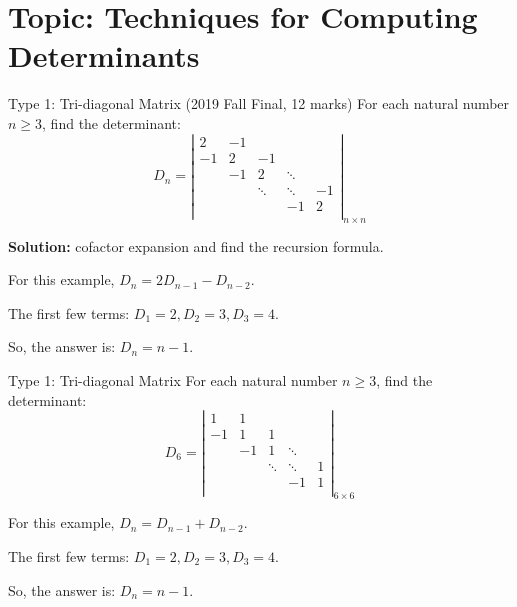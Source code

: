 \documentclass{beamer}
\begin{document}
\section{Topic: Techniques for Computing Determinants}
\begin{frame}{Type 1: Tri-diagonal Matrix}
(2019 Fall Final, 12 marks) For each natural number $n\geqslant 3$, find the determinant:
\begin{equation*}
    D_n=\left| \begin{matrix}
        2&		-1&		&		&		\\
        -1&		2&		-1&		&		\\
        &		-1&		2&		\ddots&		\\
        &		&		\ddots&		\ddots&		-1\\
        &		&		&		-1&		2\\
    \end{matrix} \right|_{n\times n}
\end{equation*}

\textbf{Solution:} cofactor expansion and find the recursion formula.

\vspace{3pt}
For this example, $D_n=2D_{n-1}-D_{n-2}$.

\vspace{3pt}
The first few terms: $D_1=2, D_2=3, D_3=4$.

\vspace{3pt}
So, the answer is: $D_n=n-1$.
\end{frame}

\begin{frame}{Type 1: Tri-diagonal Matrix}
For each natural number $n\geqslant 3$, find the determinant:
\begin{equation*}
    D_6=\left| \begin{matrix}
        1&		1&		&		&		\\
        -1&		1&		1&		&		\\
        &		-1&		1&		\ddots&		\\
        &		&		\ddots&		\ddots&		1\\
        &		&		&		-1&		1\\
    \end{matrix} \right|_{6\times 6}
\end{equation*}

\vspace{3pt}
For this example, $D_n=D_{n-1}+D_{n-2}$.

\vspace{3pt}
The first few terms: $D_1=2, D_2=3, D_3=4$.

\vspace{3pt}
So, the answer is: $D_n=n-1$.
\end{frame}
\end{document}
